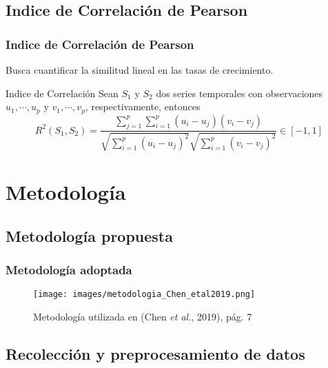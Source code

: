 \documentclass{beamer}
\begin{document}
  \subsection*{Indice de Correlación de Pearson}

  \begin{frame}
    \frametitle{Indice de Correlación de Pearson}

    \begin{outline}
      \1 Busca cuantificar la similitud lineal en las tasas de crecimiento.
    \end{outline}

    \begin{block}{Indice de Correlación}
      Sean $ S_1 $ y $ S_2 $ dos series temporales con observaciones $ u_1,\cdots, u_p $ y $ v_1,\cdots,v_p $, respectivamente, entonces
      $$ R^2(S_1,S_2) = \frac{\sum_{j=1}^p\sum_{i=1}^p(u_i-u_j)(v_i-v_j)} {\sqrt{\sum_{i=1}^p(u_i-u_j)^2}\sqrt{\sum_{i=1}^p(v_i-v_j)^2}} \in [-1,1]$$
    \end{block}

  \end{frame}

  \section{Metodología}
  \subsection*{Metodología propuesta}

  \begin{frame}
    \frametitle{Metodología adoptada}

    \begin{figure}
      \begin{center}
        \texttt{[image: images/metodologia\_Chen\_etal2019.png]}
        \caption{Metodología utilizada en (Chen \textit{et al.}, 2019), pág. 7}
      \end{center}
  \end{figure}
    
  \end{frame}

  \subsection*{Recolección y preprocesamiento de datos}
\end{document}

